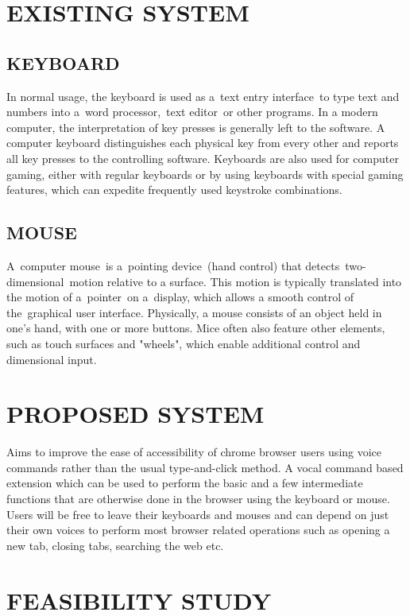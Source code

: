 \documentclass[11pt]{report} %
\begin{document}
\section{EXISTING SYSTEM}
\label{sec:EXISTING SYSTEM}

\subsection{KEYBOARD}
\label{subsec:KEYBOARD} 
In normal usage, the keyboard is used as a text entry interface to type text and numbers into a word processor, text editor or other programs. In a modern computer, the interpretation of key presses is generally left to the software. A computer keyboard distinguishes each physical key from every other and reports all key presses to the controlling software. Keyboards are also used for computer gaming, either with regular keyboards or by using keyboards with special gaming features, which can expedite frequently used keystroke combinations.

\subsection{MOUSE}
\label{subsec:MOUSE}
A computer mouse is a pointing device (hand control) that detects two-dimensional motion relative to a surface. This motion is typically translated into the motion of a pointer on a display, which allows a smooth control of the graphical user interface.
Physically, a mouse consists of an object held in one's hand, with one or more buttons. Mice often also feature other elements, such as touch surfaces and "wheels", which enable additional control and dimensional input.

\section{PROPOSED SYSTEM}
\label{sec:PROPOSED SYSTEM}
Aims to improve the ease of accessibility of chrome browser users using voice commands rather than the usual type-and-click method.
A vocal command based extension which can be used to perform the basic and a few intermediate functions that are otherwise done in the browser using the keyboard or mouse.
Users will be free to leave their keyboards and mouses and can depend on just their own voices to perform most browser related operations such as opening a new tab, closing tabs, searching the web etc. 

\section{FEASIBILITY STUDY}
\label{sec:FEASIBILITY STUDY}
\end{document}
